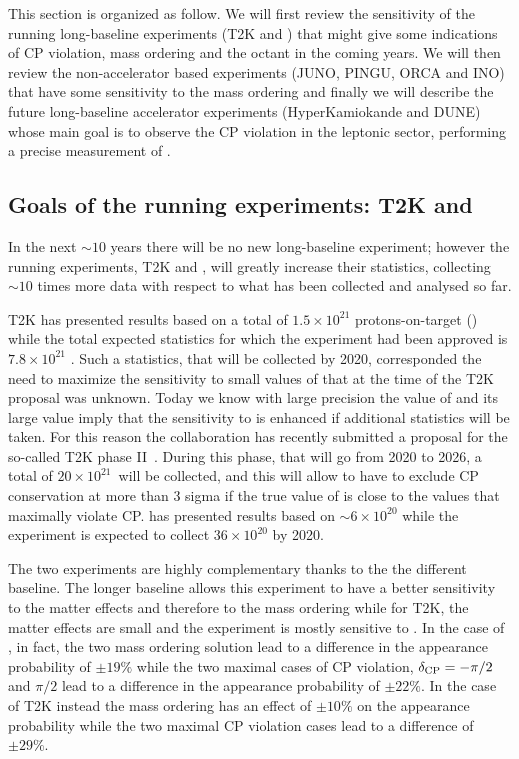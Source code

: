 This section is organized as follow. We will first review the sensitivity of the running long-baseline experiments (T2K and \nova) that might give some indications of CP violation, mass ordering and the \thatm octant in the coming years. We will then review the non-accelerator based experiments (JUNO, PINGU, ORCA and INO) that have some sensitivity to the mass ordering and finally we will describe the future long-baseline accelerator experiments (HyperKamiokande and DUNE) whose main goal is to observe the CP violation in the leptonic sector, performing a precise measurement of \dcp. 


\subsection{Goals of the running experiments: T2K and \nova}
\label{sec:futuret2knova}

In the next $\sim10$ years there will be no new long-baseline experiment; however the running experiments, T2K and \nova, will greatly increase their statistics, collecting $\sim10$ times more data with respect to what has been collected and analysed so far. 

T2K has presented results based on a total of $1.5 \times10^{21}$ protons-on-target (\pot) while the total expected statistics for which the experiment had been approved is $7.8\times10^{21}$ \pot. Such a statistics, that will be collected by 2020, corresponded the need to maximize the sensitivity to small values of \thint that at the time of the T2K proposal was unknown. Today we know with large precision the value of \thint and its large value imply that the sensitivity to \dcp is enhanced if additional statistics will be taken. For this reason the collaboration has recently submitted a proposal for the so-called T2K phase II~\cite{Abe:2016tii}. During this phase, that will go from 2020 to 2026, a total of  $20\times10^{21}$~\pot will be collected, and this will allow to have to exclude CP conservation at more than 3 sigma if the true value of \dcp is close to the values that maximally violate CP.
\nova has presented results based on $\sim6\times10^20$ \pot while the experiment is expected to collect $36\times10^{20}$ \pot by 2020. 

The two experiments are highly complementary thanks to the the different baseline. The longer \nova baseline allows this experiment to have a better sensitivity to the matter effects and therefore to the mass ordering while for T2K, the matter effects are small and the experiment is mostly sensitive to \dcp. In the case of \nova, in fact, the two mass ordering solution lead to a difference in the \nue appearance probability of $\pm19\%$ while the two maximal cases of CP violation, $\delta_{\mathrm{CP}}=-\pi/2$ and $\pi/2$ lead to a difference in the \nue appearance probability of $\pm22\%$. In the case of T2K instead the mass ordering has an effect of $\pm10\%$ on the appearance probability while the two maximal CP violation cases lead to a difference of $\pm29\%$. 

